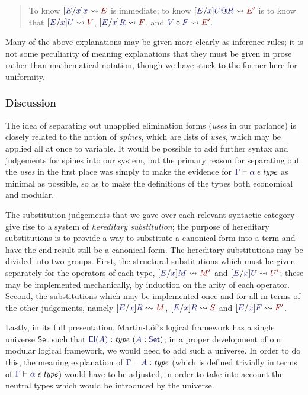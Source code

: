 \documentclass[main.tex]{subfiles}
\begin{document}
\begin{quote}
  To know $\hsubstrm{E}{x}{x}{E}$ is immediate; to know
$\hsubstrm{E}{x}{\elim{U}{R}}{E'}$ is to know that
$\hsubstu{E}{x}{U}{V}$, $\hsubstrm{E}{x}{R}{F}$, and $\eapply{V}{F}{E'}$.
\end{quote}\medskip

Many of the above explanations may be given more clearly as inference
rules; it is not some peculiarity of meaning explanations that they
must be given in prose rather than mathematical notation, though we
have stuck to the former here for uniformity.

\subsubsection{Discussion}

The idea of separating out unapplied elimination forms (\emph{uses} in
our parlance) is closely related to the notion of \emph{spines}, which
are lists of \emph{uses}, which may be applied all at once to
variable. It would be possible to add further syntax and judgements
for spines into our system, but the primary reason for separating out
the \emph{uses} in the first place was simply to make the evidence for
$\lfsequent\Gamma\cantype{\alpha}$ as minimal as possible, so as to make the
definitions of the types both economical and modular.

The substitution judgements that we gave over each relevant syntactic
category give rise to a system of \emph{hereditary substitution}; the
purpose of hereditary substitutions is to provide a way to substitute
a canonical form into a term and have the end result still be a
canonical form. The hereditary substitutions may be divided into two
groups. First, the structural substitutions which must be given
separately for the operators of each type, $\hsubstm{E}{x}{M}{M'}$ and
$\hsubstr{E}{x}{U}{U'}$; these may be implemented mechanically, by
induction on the arity of each operator. Second, the substitutions
which may be implemented once and for all in terms of the other
judgements, namely $\hsubstrm{E}{x}{R}{M}$, $\hsubstr{E}{x}{R}{S}$ and
$\hsubste{E}{x}{F}{F'}$.

Lastly, in its full presentation, Martin-L\"of's logical framework has
a single universe $\mathsf{Set}$ such that
$\hyp{\type{\mathsf{El}(A)}}{\ofty{A}{\mathsf{Set}}}$; in a proper
development of our modular logical framework, we would need to add
such a universe. In order to do this, the meaning explanation of
$\lfsequent\Gamma\type{A}$ (which is defined trivially in terms of
$\lfsequent\Gamma\cantype\alpha$) would have to be adjusted, in order
to take into account the neutral types which would be introduced by
the universe.
\end{document}
